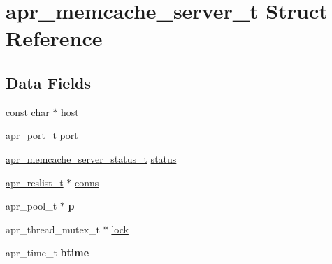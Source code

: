 \hypertarget{structapr__memcache__server__t}{\section{apr\-\_\-memcache\-\_\-server\-\_\-t Struct Reference}
\label{structapr__memcache__server__t}
}
\subsection*{Data Fields}
\begin{DoxyCompactItemize}
\item 
const char $\ast$ \hyperlink{structapr__memcache__server__t_a3f0cbe5cde09d28791f8a8950258b305}{host}
\item 
apr\-\_\-port\-\_\-t \hyperlink{structapr__memcache__server__t_aade2ee234b229b6711a80fe2a3de853b}{port}
\item 
\hyperlink{group___a_p_r___util___m_c_ga3b18c7c3f0ecabb930b78aa549c2e2e8}{apr\-\_\-memcache\-\_\-server\-\_\-status\-\_\-t} \hyperlink{structapr__memcache__server__t_a641c9cd95499a998ba2717ec5f03b174}{status}
\item 
\hyperlink{group___a_p_r___util___r_l_ga670f6719dfeffe1037e063eaab7b82ac}{apr\-\_\-reslist\-\_\-t} $\ast$ \hyperlink{structapr__memcache__server__t_a49f27525b9dd7de3dfb15dba3b86bd05}{conns}
\item 
\hypertarget{structapr__memcache__server__t_a2acd73a302db659fb888889837ce4fc3}{apr\-\_\-pool\-\_\-t $\ast$ {\bfseries p}}\label{structapr__memcache__server__t_a2acd73a302db659fb888889837ce4fc3}

\item 
apr\-\_\-thread\-\_\-mutex\-\_\-t $\ast$ \hyperlink{structapr__memcache__server__t_aab472a87e5f0abe993e565a8e3a72490}{lock}
\item 
\hypertarget{structapr__memcache__server__t_a5f7fede39227399f9af9a0d19c9ba8c0}{apr\-\_\-time\-\_\-t {\bfseries btime}}\label{structapr__memcache__server__t_a5f7fede39227399f9af9a0d19c9ba8c0}

\end{DoxyCompactItemize}



